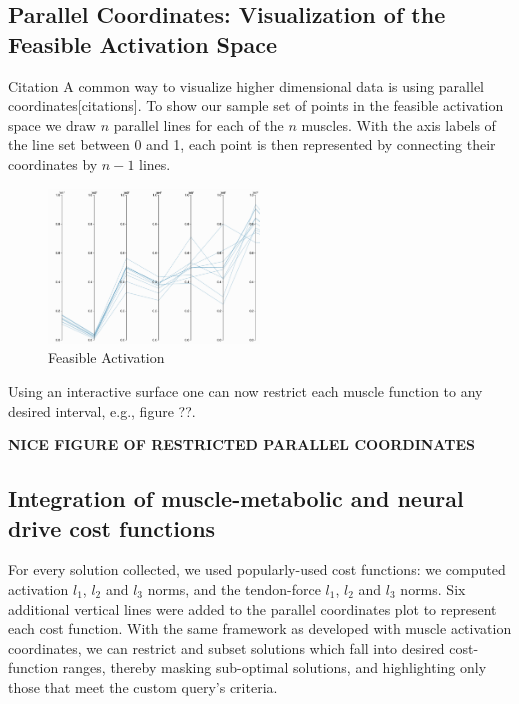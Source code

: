 \subsection{Parallel Coordinates: Visualization of the Feasible Activation Space}
Citation
A common way to visualize higher dimensional data is using parallel coordinates[citations]. To show our sample set of points in the feasible activation space we draw $n$ parallel lines for each of the $n$ muscles. With the axis labels of the line set between 0 and 1, each point is then represented by connecting their coordinates by $n-1$ lines.


\begin{figure}[ht]
   \begin{center}
    \includegraphics[width=0.5\textwidth]{pc.png}
  \end{center}
  \caption{Feasible Activation}
  \label{fig_pc}
\end{figure}

Using an interactive surface one can now restrict each muscle function to any desired interval, e.g., figure ??.

\textbf{NICE FIGURE OF RESTRICTED PARALLEL COORDINATES}
\subsection{Integration of muscle-metabolic and neural drive cost functions} %

For every solution collected, we used popularly-used cost functions: we computed activation $l_1$, $l_2$ and $l_3$ norms, and the tendon-force $l_1$, $l_2$ and $l_3$ norms. Six additional vertical lines were added to the parallel coordinates plot to represent each cost function. With the same framework as developed with muscle activation coordinates, we can restrict and subset solutions which fall into desired cost-function ranges, thereby masking sub-optimal solutions, and highlighting only those that meet the custom query's criteria.

